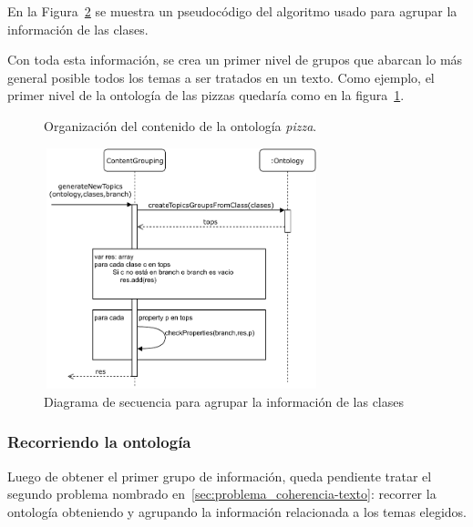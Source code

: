 En la Figura~\ref{fig:diagrama_secuencia_contentGrouping} se muestra un pseudocódigo del algoritmo usado para agrupar la información de las clases.

Con toda esta información, se crea un primer nivel de grupos que abarcan lo más general posible todos los temas a ser tratados en un texto. Como ejemplo, el primer nivel de la ontología de las pizzas quedaría como en la figura~\ref{fig:macro_planning_pizza}.

\begin{figure}[H]
\begin{minipage}[c]{0.7\textwidth}
{\small 
{}}
\caption{Organización del contenido de la ontología \emph{pizza}.}
\label{fig:macro_planning_pizza}
\end{minipage}
\end{figure}


\begin{figure}[H]
    \centering
    \includegraphics[width=8cm, height=7cm]{img/organizacion_informacion/secuencia_contentGrouping}
    \caption{Diagrama de secuencia para agrupar la información de las clases}
    \label{fig:diagrama_secuencia_contentGrouping}
\end{figure}


\subsubsection{Recorriendo la ontología}
Luego de obtener el primer grupo de información, queda pendiente tratar el segundo problema nombrado en~\ref{sec:problema_coherencia-texto}: recorrer la ontología obteniendo y agrupando la información relacionada a los temas elegidos. 


